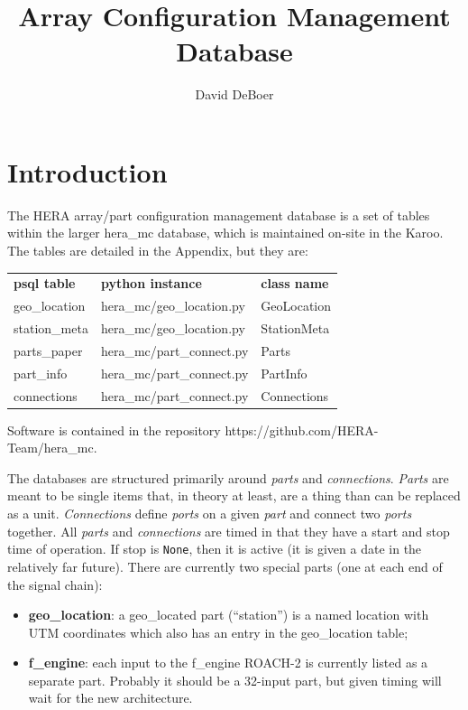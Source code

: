 \documentclass{article}
\begin{document}
\author{David DeBoer}
\title{Array Configuration Management Database}
\maketitle

\section{Introduction}
The HERA array/part configuration management database is a set of tables within the larger hera\_mc database, which is maintained on-site in the Karoo.  The tables are detailed in the Appendix, 
but they are:  
\begin{tabular}{l l l}
         {\bf psql table} & {\bf python instance}  &  {\bf class name} \\
	geo\_location 	& hera\_mc/geo\_location.py & GeoLocation \\
	station\_meta 	& hera\_mc/geo\_location.py & StationMeta \\
	parts\_paper 	& hera\_mc/part\_connect.py & Parts \\
	part\_info 	         & hera\_mc/part\_connect.py & PartInfo \\
	connections 	& hera\_mc/part\_connect.py & Connections \\
\end{tabular}

Software is contained in the repository https://github.com/HERA-Team/hera\_mc.

The databases are structured primarily around {\em parts} and {\em connections}.  {\em Parts} are meant to be single items that, in theory at least, are a thing than can be replaced as a unit.  
{\em Connections} define {\em ports} on a given {\em part} and connect two {\em ports} together.  All {\em parts} and {\em connections} are timed in that they have a start and stop time of operation.  If stop is {\tt None}, then it is active (it is given a date in the relatively far future).  There are currently two special parts (one at each end of the signal chain):
\begin{itemize}
	\item {\bf geo\_location}: a geo\_located part (``station'') is a named location with UTM coordinates which also has an entry in the geo\_location table;
	\item {\bf f\_engine}:  each input to the f\_engine ROACH-2 is currently listed as a separate part.  Probably it should be a 32-input part, but given timing will wait for the new architecture.
\end{itemize}
\end{document}
